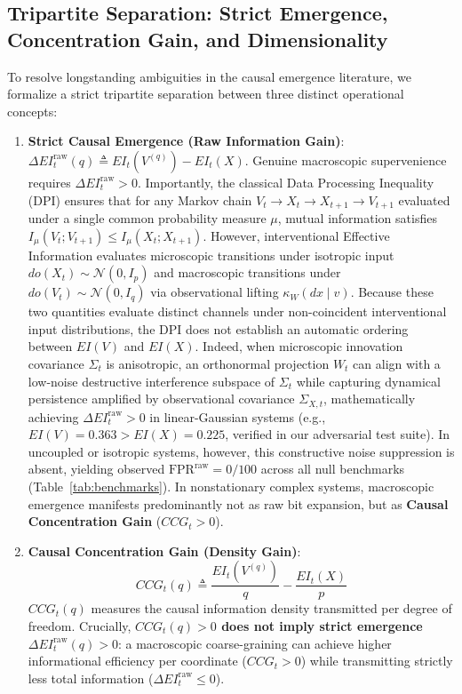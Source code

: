 \documentclass[10pt,twocolumn,journal]{article}
\begin{document}
\subsection{Tripartite Separation: Strict Emergence, Concentration Gain, and Dimensionality}
To resolve longstanding ambiguities in the causal emergence literature, we formalize a strict tripartite separation between three distinct operational concepts:
\begin{enumerate}[noitemsep,topsep=1pt,partopsep=0pt,parsep=0pt]
    \item \textbf{Strict Causal Emergence (Raw Information Gain)}: $\Delta EI_t^{\text{raw}}(q) \triangleq EI_t(V^{(q)}) - EI_t(X)$. Genuine macroscopic supervenience requires $\Delta EI_t^{\text{raw}} > 0$. Importantly, the classical Data Processing Inequality (DPI) ensures that for any Markov chain $V_t \to X_t \to X_{t+1} \to V_{t+1}$ evaluated under a single common probability measure $\mu$, mutual information satisfies $I_\mu(V_t; V_{t+1}) \le I_\mu(X_t; X_{t+1})$. However, interventional Effective Information evaluates microscopic transitions under isotropic input $do(X_t) \sim \mathcal{N}(0, I_p)$ and macroscopic transitions under $do(V_t) \sim \mathcal{N}(0, I_q)$ via observational lifting $\kappa_W(dx \mid v)$. Because these two quantities evaluate distinct channels under non-coincident interventional input distributions, the DPI does not establish an automatic ordering between $EI(V)$ and $EI(X)$. Indeed, when microscopic innovation covariance $\Sigma_t$ is anisotropic, an orthonormal projection $W_t$ can align with a low-noise destructive interference subspace of $\Sigma_t$ while capturing dynamical persistence amplified by observational covariance $\Sigma_{X,t}$, mathematically achieving $\Delta EI_t^{\text{raw}} > 0$ in linear-Gaussian systems (e.g., $EI(V) = 0.363 > EI(X) = 0.225$, verified in our adversarial test suite). In uncoupled or isotropic systems, however, this constructive noise suppression is absent, yielding observed $\text{FPR}^{\text{raw}} = 0/100$ across all null benchmarks (Table~\ref{tab:benchmarks}). In nonstationary complex systems, macroscopic emergence manifests predominantly not as raw bit expansion, but as \textbf{Causal Concentration Gain} ($CCG_t > 0$).
    \item \textbf{Causal Concentration Gain (Density Gain)}: 
    \begin{equation}
    CCG_t(q) \triangleq \frac{EI_t(V^{(q)})}{q} - \frac{EI_t(X)}{p}
    \label{eq:ccg_def}
    \end{equation}
    $CCG_t(q)$ measures the causal information density transmitted per degree of freedom. Crucially, \textbf{$CCG_t(q) > 0$ does not imply strict emergence $\Delta EI_t^{\text{raw}}(q) > 0$}: a macroscopic coarse-graining can achieve higher informational efficiency per coordinate ($CCG_t > 0$) while transmitting strictly less total information ($\Delta EI_t^{\text{raw}} \le 0$).

\end{enumerate}
\end{document}
